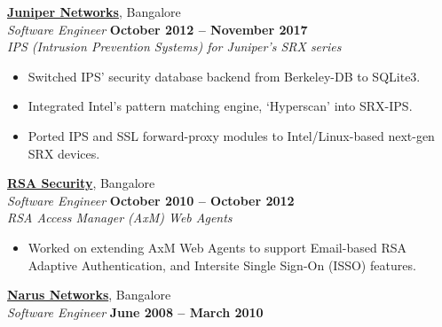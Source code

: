 \documentclass[9pt]{article}
\begin{document}
    \href{http://www.juniper.net}{\textbf{Juniper Networks}}, Bangalore \\%
    \textsl{Software Engineer} \hfill \textbf{October 2012 -- November 2017}\\%
    
	\textsl{IPS (Intrusion Prevention Systems) for Juniper's SRX series}
	\begin{itemize}
	\itemsep0em
		\item Switched IPS' security database backend from Berkeley-DB to SQLite3.%
        \item Integrated Intel's pattern matching engine, `Hyperscan' into SRX-IPS.%
		\item Ported IPS and SSL forward-proxy modules to Intel/Linux-based next-gen SRX devices.\vspace{1mm}\\\vspace{1mm}%
	\end{itemize}

    \href{http://www.rsa.com/}{\textbf{RSA Security}}, Bangalore \\%
    \textsl{Software Engineer} \hfill \textbf{October 2010 -- October 2012}\\%
    
	\textsl{RSA Access Manager (AxM) Web Agents}
	\begin{itemize}
	\itemsep0em
		\item Worked on extending AxM Web Agents to support Email-based RSA Adaptive Authentication, and Intersite Single Sign-On (ISSO) features.\vspace{0mm}\\\vspace{1mm}%
	\end{itemize}

    \pagebreak %

    \href{https://en.wikipedia.org/wiki/Narus_(company)}{\textbf{Narus Networks}}, Bangalore \\%
    \textsl{Software Engineer} \hfill \textbf{June 2008 -- March 2010}\\%
	
\end{document}
